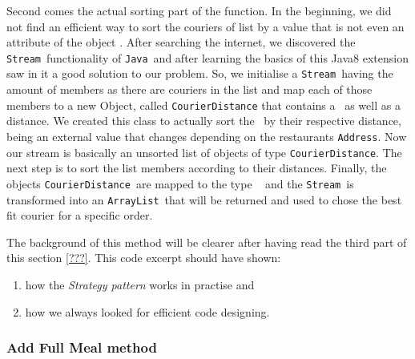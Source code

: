 Second comes the actual sorting part of the function. In the beginning, we did not find an efficient way to sort the couriers of list by a value that is not even an attribute of the object \Courier. After searching the internet, we discovered the \lstinline|Stream|~functionality of \lstinline|Java|~and after learning the basics of this Java8 extension saw in it a good solution to our problem. So, we initialise a \lstinline|Stream|~having the amount of members as there are couriers in the list and map each of those members to a new Object, called 
\lstinline|CourierDistance| that contains a \Courier~as well as a distance. We created this class to actually sort the \Courier~by their respective distance, being an external value that changes depending on the restaurants \lstinline|Address|. Now our stream is basically an unsorted list of objects of type \lstinline|CourierDistance|. The next step is to sort the list members according to their distances. Finally, the objects \lstinline|CourierDistance|~are mapped to the type \Courier~ and the \lstinline|Stream|~is transformed into an \lstinline|ArrayList|~that will be returned and used to chose the best fit courier for a specific order. 

The background of this method will be clearer after having read the third part of this section \ref{???}. This code excerpt should have shown:

\begin{enumerate}
	\item how the \emph{Strategy pattern} works in practise and
	\item how we always looked for efficient code designing.
\end{enumerate}


\subsubsection{Add Full Meal method} %
\label{ssub:add_full_meal_method}















